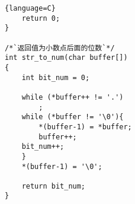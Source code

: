 \documentclass{article}
\begin{document}
\begin{CJK*}{UTF8}{gbsn}
\begin{lstlisting}{language=C}
    return 0;
}

/*`返回值为小数点后面的位数`*/
int str_to_num(char buffer[])
{
    int bit_num = 0;

    while (*buffer++ != '.')
        ;
    while (*buffer != '\0'){
        *(buffer-1) = *buffer; 
        buffer++;
	bit_num++;
    }
    *(buffer-1) = '\0';

    return bit_num;
}

\end{lstlisting}


\end{CJK*}
\end{document}
